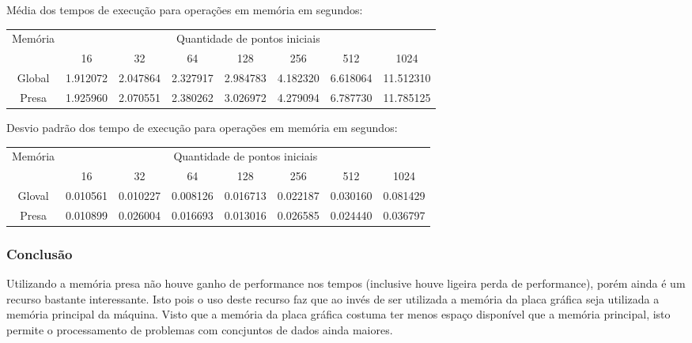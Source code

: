   \hspace{1mm}\newline
  
  \begin{small}
  \noindent Média dos tempos de execução para operações em memória em segundos:\\
  \begin{tabular}{| c | c | c | c | c | c | c | c |}
    \hline
    \multirow{2}{*}{Memória}& \multicolumn{7}{|c|}{Quantidade de pontos iniciais} \\ \cline{2-8}
    & 16 & 32 & 64 & 128 & 256 & 512 & 1024 \\ \hline
    Global & 1.912072 & 2.047864 & 2.327917 & 2.984783 & 4.182320 & 6.618064 & 11.512310 \\ \hline
    Presa & 1.925960 & 2.070551 & 2.380262 & 3.026972 & 4.279094 & 6.787730 & 11.785125\\ \hline
  \end{tabular}
  \end{small}
  
  \hspace{1mm}\newline
  
  \noindent Desvio padrão dos tempo de execução para operações em memória em segundos:\\
  \begin{tabular}{| c | c | c | c | c | c | c | c |}
    \hline
    \multirow{2}{*}{Memória}& \multicolumn{7}{|c|}{Quantidade de pontos iniciais} \\ \cline{2-8}
    & 16 & 32 & 64 & 128 & 256 & 512 & 1024\\ \hline
    Gloval & 0.010561 & 0.010227 & 0.008126 & 0.016713 & 0.022187 & 0.030160 & 0.081429\\ \hline
    Presa & 0.010899 & 0.026004 & 0.016693 & 0.013016 & 0.026585 & 0.024440 & 0.036797\\ \hline
  \end{tabular}
  
    \subsubsection{Conclusão}
    Utilizando a memória presa não houve ganho de performance nos tempos (inclusive houve ligeira perda de performance), porém ainda é um recurso bastante interessante. Isto pois o uso deste recurso faz que ao invés de ser utilizada a memória da placa gráfica seja utilizada a memória principal da máquina. Visto que a memória da placa gráfica costuma ter menos espaço disponível que a memória principal, isto permite o processamento de problemas com concjuntos de dados ainda maiores.
  
